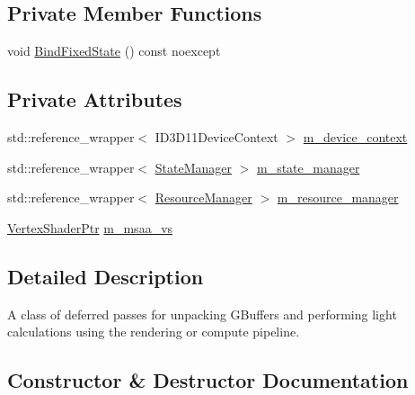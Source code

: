 \subsection*{Private Member Functions}
\begin{DoxyCompactItemize}
\item 
void \hyperlink{classmage_1_1rendering_1_1_deferred_pass_ab0d7b1aa091b0884dcb1e628c997f38b}{Bind\+Fixed\+State} () const noexcept
\end{DoxyCompactItemize}
\subsection*{Private Attributes}
\begin{DoxyCompactItemize}
\item 
std\+::reference\+\_\+wrapper$<$ I\+D3\+D11\+Device\+Context $>$ \hyperlink{classmage_1_1rendering_1_1_deferred_pass_afd07209849a7969475c9110fbdb0c4a4}{m\+\_\+device\+\_\+context}
\item 
std\+::reference\+\_\+wrapper$<$ \hyperlink{classmage_1_1rendering_1_1_state_manager}{State\+Manager} $>$ \hyperlink{classmage_1_1rendering_1_1_deferred_pass_aaeabb408d0454f13fdabad2a8e668f61}{m\+\_\+state\+\_\+manager}
\item 
std\+::reference\+\_\+wrapper$<$ \hyperlink{classmage_1_1rendering_1_1_resource_manager}{Resource\+Manager} $>$ \hyperlink{classmage_1_1rendering_1_1_deferred_pass_a542cc2833e2df7b7697f2c1d769dce36}{m\+\_\+resource\+\_\+manager}
\item 
\hyperlink{namespacemage_1_1rendering_aaf704b9c54a4181f4950a1761de69dda}{Vertex\+Shader\+Ptr} \hyperlink{classmage_1_1rendering_1_1_deferred_pass_aea0ac2159ea383b80fcbc603a6b86363}{m\+\_\+msaa\+\_\+vs}
\end{DoxyCompactItemize}


\subsection{Detailed Description}
A class of deferred passes for unpacking G\+Buffers and performing light calculations using the rendering or compute pipeline. 

\subsection{Constructor \& Destructor Documentation}
\hypertarget{classmage_1_1rendering_1_1_deferred_pass_a3543b3f27812467d425d579d2e226a7a}{}\label{classmage_1_1rendering_1_1_deferred_pass_a3543b3f27812467d425d579d2e226a7a} 
